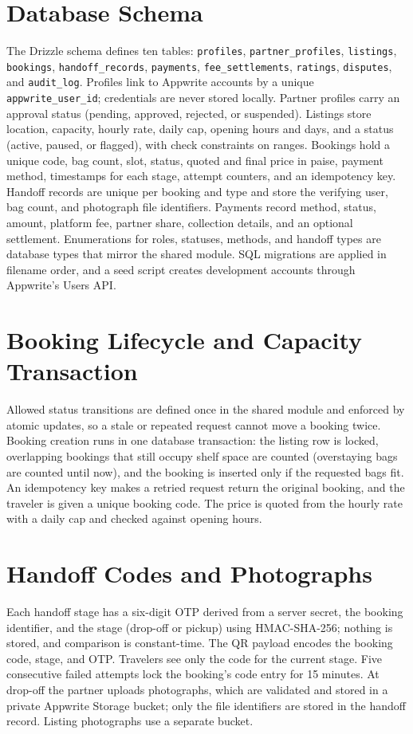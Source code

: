 \documentclass{tietreport}
\begin{document}
\section{Database Schema}
The Drizzle schema defines ten tables: \texttt{profiles}, \texttt{partner\_profiles}, \texttt{listings}, \texttt{bookings}, \texttt{handoff\_records}, \texttt{payments}, \texttt{fee\_settlements}, \texttt{ratings}, \texttt{disputes}, and \texttt{audit\_log}. Profiles link to Appwrite accounts by a unique \texttt{appwrite\_user\_id}; credentials are never stored locally. Partner profiles carry an approval status (pending, approved, rejected, or suspended). Listings store location, capacity, hourly rate, daily cap, opening hours and days, and a status (active, paused, or flagged), with check constraints on ranges. Bookings hold a unique code, bag count, slot, status, quoted and final price in paise, payment method, timestamps for each stage, attempt counters, and an idempotency key. Handoff records are unique per booking and type and store the verifying user, bag count, and photograph file identifiers. Payments record method, status, amount, platform fee, partner share, collection details, and an optional settlement. Enumerations for roles, statuses, methods, and handoff types are database types that mirror the shared module. SQL migrations are applied in filename order, and a seed script creates development accounts through Appwrite's Users API.

\section{Booking Lifecycle and Capacity Transaction}
Allowed status transitions are defined once in the shared module and enforced by atomic updates, so a stale or repeated request cannot move a booking twice. Booking creation runs in one database transaction: the listing row is locked, overlapping bookings that still occupy shelf space are counted (overstaying bags are counted until now), and the booking is inserted only if the requested bags fit. An idempotency key makes a retried request return the original booking, and the traveler is given a unique booking code. The price is quoted from the hourly rate with a daily cap and checked against opening hours.

\section{Handoff Codes and Photographs}
Each handoff stage has a six-digit OTP derived from a server secret, the booking identifier, and the stage (drop-off or pickup) using HMAC-SHA-256; nothing is stored, and comparison is constant-time. The QR payload encodes the booking code, stage, and OTP. Travelers see only the code for the current stage. Five consecutive failed attempts lock the booking's code entry for 15 minutes. At drop-off the partner uploads photographs, which are validated and stored in a private Appwrite Storage bucket; only the file identifiers are stored in the handoff record. Listing photographs use a separate bucket.
\end{document}
